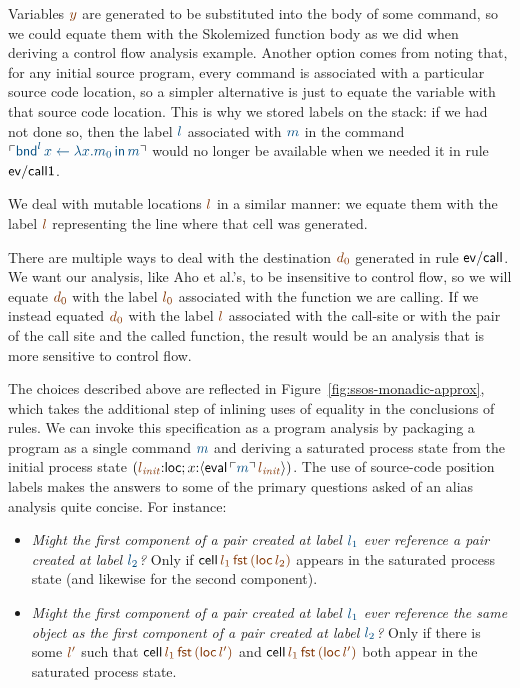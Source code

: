 Variables $\lf{y}$ are generated to be substituted into the body of some
command, so we could equate them with the Skolemized function body as
we did when deriving a control flow analysis example. Another option
comes from noting that, for any initial source program, every command
is associated with a particular source code location, so a simpler
alternative is just to equate the variable with that source code
location. This is why we stored labels on the stack: if we had not
done so, then the label $\obj{l}$ associated with $\obj{m}$ in the command
$\interp{{\sf bnd}^l\, x \leftarrow \lambda x.m_0 \,{\sf in}\,m}$ would
no longer be available when we needed it in rule ${\sf ev/call1}$.

We deal with mutable locations $\lf{l}$ in a similar manner: we equate them
with the label $\lf{l}$ representing the line where that cell was
generated.

There are multiple ways to deal with the destination $\lf{d_0}$ generated
in rule ${\sf ev/call}$. We want our analysis, like Aho et al.'s, to
be insensitive to control flow, so we will equate $\lf{d_0}$ with the label
$\lf{l_0}$ associated with the function we are calling.  If we instead
equated $\lf{d_0}$ with the label $\lf{l}$ associated with the call-site or with
the pair of the call site and the called function, the result would be
an analysis that is more sensitive to control flow.

The choices described above are reflected in
Figure~\ref{fig:ssos-monadic-approx}, which takes the additional step
of inlining uses of equality in the conclusions of rules. We can
invoke this specification as a program analysis by packaging a program
as a single command $\obj{m}$ and deriving a saturated process state from the
initial process state $(\lf{l_{\it init}}{:}{\sf loc}; x{:}\susp{{\sf
    eval}\,\interp{m}\,\lf{l_{\it init}}})$. 
The use of source-code position labels
makes the answers to some of the primary questions asked of an alias
analysis quite concise. For instance:

\smallskip
\begin{itemize}
\item {\it Might the first component of a pair created at label
    $\obj{l_1}$ ever reference a pair created at label $\obj{l_2}$?}
  Only if ${\sf cell}\,\lf{l_1}\,\lf{\sf fst}\,\lf{({\sf loc}\,l_2)}$
  appears in the saturated process state (and likewise for the second
  component).
\item {\it Might the first component of a pair created at label
    $\obj{l_1}$ ever reference the same object as the first component
    of a pair created at label $\obj{l_2}$?} Only if there is some
  $\lf{l'}$ such that ${\sf cell}\,\lf{l_1}\,\lf{\sf fst}\,\lf{({\sf
      loc}\,l')}$ and ${\sf cell}\,\lf{l_1}\,\lf{\sf fst}\,\lf{({\sf
      loc}\,l')}$ both appear in the saturated process state.
\end{itemize}

